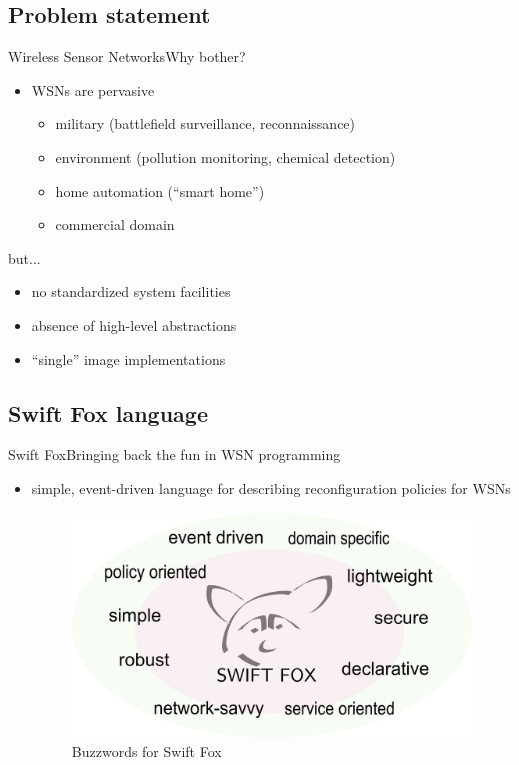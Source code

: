 \documentclass{beamer}
\begin{document}
\subsection[Problem statement]{Problem statement}

\begin{frame}{Wireless Sensor Networks}{Why bother?}
	\begin{itemize}
	\item WSNs are pervasive
		\begin{itemize}
		\item military (battlefield surveillance, reconnaissance)
		\item environment (pollution monitoring, chemical
			detection)
		\item home automation (``smart home'')
		\item commercial domain 
		\end{itemize}
	\end{itemize}
	\begin{block}{but...}
		\begin{itemize}
		\item no standardized system facilities
		\item absence of high-level abstractions
		\item ``single'' image implementations
		\end{itemize}
	\end{block}
\end{frame}

\subsection[Swift Fox]{Swift Fox language}

\begin{frame}{Swift Fox}{Bringing back the fun in WSN programming}
	\begin{itemize}
	\item simple, event-driven language for describing
		reconfiguration policies for WSNs
	\begin{figure}
		\begin{center}
		\includegraphics[scale=0.1]{fig/buzz.pdf}
		\end{center}
		\caption{Buzzwords for Swift Fox}
	\end{figure} 

	\end{itemize}
\end{frame}
\end{document}
